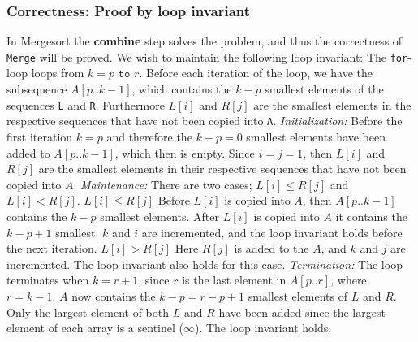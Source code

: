 \subsubsection*{Correctness: Proof by loop invariant}
In Mergesort the \textbf{combine} step solves the problem, and thus the
correctness of \texttt{Merge} will be proved.\newline\newline
We wish to maintain the following loop invariant:
\newline\newline
The \texttt{for}-loop loops from $k=p \texttt{ to } r$. Before each iteration of
the loop, we have the subsequence $A[p..k-1]$, which contains the $k-p$ smallest
elements of the sequences \texttt{L} and \texttt{R}. Furthermore $L[i]$ and
$R[j]$ are the smallest elements in the respective sequences that have not been
copied into \texttt{A}.
\newline\newline
\textit{Initialization:}\newline
Before the first iteration $k=p$ and therefore the $k-p=0$ smallest elements
have been added to $A[p..k-1]$, which then is empty. Since $i=j=1$, then $L[i]$
and $R[j]$ are the smallest elements in their respective sequences that have not
been copied into $A$.
\newline\newline
\textit{Maintenance:}\newline
There are two cases; $L[i]\leq R[j]$ and $L[i]<R[j]$.\newline\newline
$L[i]\leq R[j]$\newline
Before $L[i]$ is copied into $A$, then $A[p..k-1]$ contains the $k-p$ smallest
elements. After $L[i]$ is copied into $A$ it contains the $k-p+1$ smallest. $k$
and $i$ are incremented, and the loop invariant holds before the next iteration.
\newline\newline
$L[i]>R[j]$\newline
Here $R[j]$ is added to the $A$, and $k$ and $j$ are incremented. The loop
invariant also holds for this case.
\newline\newline
\textit{Termination:}\newline
The loop terminates when $k=r+1$, since $r$ is the last element in $A[p..r]$,
where $r=k-1$. $A$ now contains the $k-p=r-p+1$ smallest elements of $L$ and
$R$. Only the largest element of both $L$ and $R$ have been added since the
largest element of each array is a sentinel ($\infty$). The loop invariant holds.
